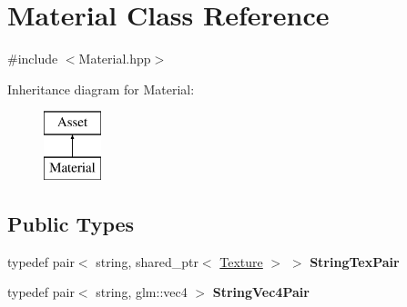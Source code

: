 \hypertarget{class_material}{}\section{Material Class Reference}
\label{class_material}


{\ttfamily \#include $<$Material.\+hpp$>$}

Inheritance diagram for Material\+:\begin{figure}[H]
\begin{center}
\leavevmode
\includegraphics[height=2.000000cm]{class_material}
\end{center}
\end{figure}
\subsection*{Public Types}
\begin{DoxyCompactItemize}
\item 
\hypertarget{class_material_a3bfabbc4ad755103c699c24723a9b995}{}typedef pair$<$ string, shared\+\_\+ptr$<$ \hyperlink{class_texture}{Texture} $>$ $>$ {\bfseries String\+Tex\+Pair}\label{class_material_a3bfabbc4ad755103c699c24723a9b995}

\item 
\hypertarget{class_material_a1543230ce172cd78e40f09caf3ea316b}{}typedef pair$<$ string, glm\+::vec4 $>$ {\bfseries String\+Vec4\+Pair}\label{class_material_a1543230ce172cd78e40f09caf3ea316b}

\end{DoxyCompactItemize}
